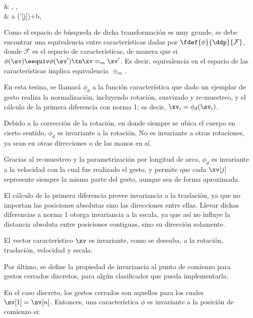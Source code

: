 {& \existsroti,  \existsb,  \existsa \\ 
& \sv[j] \eequiv  a (\roti \sv'[j])+b, \;   }


Como el espacio de búsqueda de dicha transformación es muy grande, se debe encontrar una equivalencia entre características dadas por $ \fdef{\phi}{\ddp}{\mathcal{F}}$, donde $\mathcal{F}$ es el espacio de características, de manera que si $ \phi(\sv) \eequiv \phi(\sv') \tn \xv \equiv_m \xv'$. Es decir, equivalencia en el espacio de las características implica  equivalencia $\equiv_m$. 

En esta tesina, se llamará  $\phi_d$ a la función característica que dado un ejemplar de gesto realiza la normalización, incluyendo rotación, suavizado y re-muestreo, y el cálculo de la primera diferencia con norma 1; es decir, $\xv_i=\phi_d(\sv_i)$. 

Debido a la corrección de la rotación, en donde siempre se ubica el cuerpo en cierto sentido, $\phi_d$ es invariante a la rotación. No es invariante a otras rotaciones, ya sean en otras direcciones o de las manos en sí.

Gracias al re-muestreo y la parametrización por longitud de arco, $\phi_d$ es invariante a la velocidad con la cual fue realizado el gesto, y permite que cada $\xv[j]$ represente siempre la misma parte del gesto, aunque sea de forma aproximada.

El cálculo de la primera diferencia provee invariancia a la traslación, ya que no importan las posiciones absolutas sino las direcciones entre ellas. Llevar dichas diferencias a norma 1 otorga invariancia a la escala, ya que así no influye la distancia absoluta entre posiciones contiguas, sino su dirección solamente.

El vector característico $\xv$ es invariante, como se deseaba, a la rotación, traslación, velocidad y escala.

Por último, se define la propiedad de invariancia al punto de comienzo para gestos cerrados discretos, para algún clasificador que pueda implementarla.

En el caso discreto, los gestos cerrados son aquellos para los cuales $\sv[1] = \sv[n]$. Entonces, una característica $\phi$ es invariante a la posición de comienzo si:


